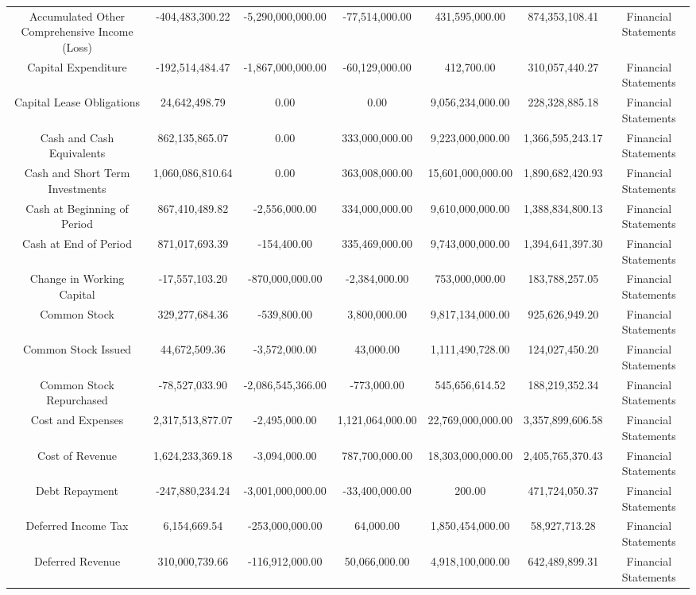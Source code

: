 \begin{longtable}{ccccccc}
Accumulated Other Comprehensive Income (Loss) & -404,483,300.22 & -5,290,000,000.00 & -77,514,000.00 & 431,595,000.00 & 874,353,108.41 & Financial Statements \\
Capital Expenditure & -192,514,484.47 & -1,867,000,000.00 & -60,129,000.00 & 412,700.00 & 310,057,440.27 & Financial Statements \\
Capital Lease Obligations & 24,642,498.79 & 0.00 & 0.00 & 9,056,234,000.00 & 228,328,885.18 & Financial Statements \\
Cash and Cash Equivalents & 862,135,865.07 & 0.00 & 333,000,000.00 & 9,223,000,000.00 & 1,366,595,243.17 & Financial Statements \\
Cash and Short Term Investments & 1,060,086,810.64 & 0.00 & 363,008,000.00 & 15,601,000,000.00 & 1,890,682,420.93 & Financial Statements \\
Cash at Beginning of Period & 867,410,489.82 & -2,556,000.00 & 334,000,000.00 & 9,610,000,000.00 & 1,388,834,800.13 & Financial Statements \\
Cash at End of Period & 871,017,693.39 & -154,400.00 & 335,469,000.00 & 9,743,000,000.00 & 1,394,641,397.30 & Financial Statements \\
Change in Working Capital & -17,557,103.20 & -870,000,000.00 & -2,384,000.00 & 753,000,000.00 & 183,788,257.05 & Financial Statements \\
Common Stock & 329,277,684.36 & -539,800.00 & 3,800,000.00 & 9,817,134,000.00 & 925,626,949.20 & Financial Statements \\
Common Stock Issued & 44,672,509.36 & -3,572,000.00 & 43,000.00 & 1,111,490,728.00 & 124,027,450.20 & Financial Statements \\
Common Stock Repurchased & -78,527,033.90 & -2,086,545,366.00 & -773,000.00 & 545,656,614.52 & 188,219,352.34 & Financial Statements \\
Cost and Expenses & 2,317,513,877.07 & -2,495,000.00 & 1,121,064,000.00 & 22,769,000,000.00 & 3,357,899,606.58 & Financial Statements \\
Cost of Revenue & 1,624,233,369.18 & -3,094,000.00 & 787,700,000.00 & 18,303,000,000.00 & 2,405,765,370.43 & Financial Statements \\
Debt Repayment & -247,880,234.24 & -3,001,000,000.00 & -33,400,000.00 & 200.00 & 471,724,050.37 & Financial Statements \\
Deferred Income Tax & 6,154,669.54 & -253,000,000.00 & 64,000.00 & 1,850,454,000.00 & 58,927,713.28 & Financial Statements \\
Deferred Revenue & 310,000,739.66 & -116,912,000.00 & 50,066,000.00 & 4,918,100,000.00 & 642,489,899.31 & Financial Statements \\

\end{longtable}
